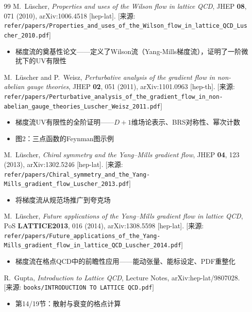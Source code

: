 \documentclass[12pt,a4paper]{ctexart}
\theoremstyle{definition}
\begin{document}
\begin{thebibliography}{99}
M.~L\"uscher,
\textit{Properties and uses of the Wilson flow in lattice QCD},
JHEP \textbf{08}, 071 (2010), arXiv:1006.4518 [hep-lat].
[来源: \texttt{refer/papers/Properties\_and\_uses\_of\_the\_Wilson\_flow\_in\_lattice\_QCD\_Luscher\_2010.pdf}]
\begin{itemize}
    \item 梯度流的奠基性论文——定义了Wilson流（Yang-Mills梯度流），证明了一阶微扰下的UV有限性
\end{itemize}

M.~L\"uscher and P.~Weisz,
\textit{Perturbative analysis of the gradient flow in non-abelian gauge theories},
JHEP \textbf{02}, 051 (2011), arXiv:1101.0963 [hep-th].
[来源: \texttt{refer/papers/Perturbative\_analysis\_of\_the\_gradient\_flow\_in\_non-abelian\_gauge\_theories\_Luscher\_Weisz\_2011.pdf}]
\begin{itemize}
    \item 梯度流UV有限性的全阶证明——$D+1$维场论表示、BRS对称性、幂次计数
    \item 图2：三点函数的Feynman图示例
\end{itemize}

M.~L\"uscher,
\textit{Chiral symmetry and the Yang--Mills gradient flow},
JHEP \textbf{04}, 123 (2013), arXiv:1302.5246 [hep-lat].
[来源: \texttt{refer/papers/Chiral\_symmetry\_and\_the\_Yang-Mills\_gradient\_flow\_Luscher\_2013.pdf}]
\begin{itemize}
    \item 将梯度流从规范场推广到夸克场
\end{itemize}

M.~L\"uscher,
\textit{Future applications of the Yang--Mills gradient flow in lattice QCD},
PoS \textbf{LATTICE2013}, 016 (2014), arXiv:1308.5598 [hep-lat].
[来源: \texttt{refer/papers/Future\_applications\_of\_the\_Yang-Mills\_gradient\_flow\_in\_lattice\_QCD\_Luscher\_2014.pdf}]
\begin{itemize}
    \item 梯度流在格点QCD中的前瞻性应用——能动张量、能标设定、PDF重整化
\end{itemize}

R.~Gupta,
\textit{Introduction to Lattice QCD},
Lecture Notes, arXiv:hep-lat/9807028.
[来源: \texttt{books/INTRODUCTION TO LATTICE QCD.pdf}]
\begin{itemize}
    \item 第14/19节：散射与衰变的格点计算
\end{itemize}


\end{thebibliography}
\end{document}
